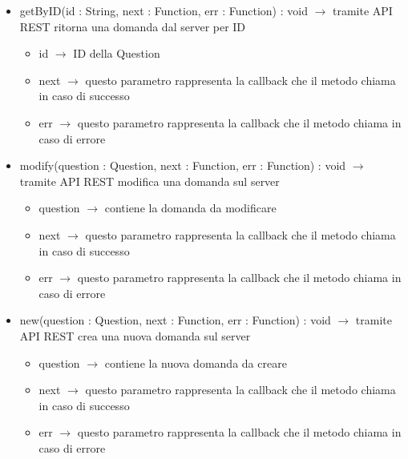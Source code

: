 \begin{description}
\begin{itemize}
	\item getByID(id : String, next : Function, err : Function) : void $\rightarrow$ tramite API REST ritorna una domanda dal server per ID\begin{itemize}
		\item id $\rightarrow$ ID della Question
		\item next $\rightarrow$ questo parametro rappresenta la callback che il metodo chiama in caso di successo
		\item err $\rightarrow$ questo parametro rappresenta la callback che il metodo chiama in caso di errore
	\end{itemize}
	
	\item modify(question : Question, next : Function, err : Function) : void $\rightarrow$ tramite API REST modifica una domanda sul server\begin{itemize}
		\item question $\rightarrow$ contiene la domanda da modificare
		\item next $\rightarrow$ questo parametro rappresenta la callback che il metodo chiama in caso di successo
		\item err $\rightarrow$ questo parametro rappresenta la callback che il metodo chiama in caso di errore
	\end{itemize}
	
	\item new(question : Question, next : Function, err : Function) : void $\rightarrow$ tramite API REST crea una nuova domanda sul server\begin{itemize}
		\item question $\rightarrow$ contiene la nuova domanda da creare
		\item next $\rightarrow$ questo parametro rappresenta la callback che il metodo chiama in caso di successo
		\item err $\rightarrow$ questo parametro rappresenta la callback che il metodo chiama in caso di errore
	\end{itemize}
	
\end{itemize}

\end{description}

